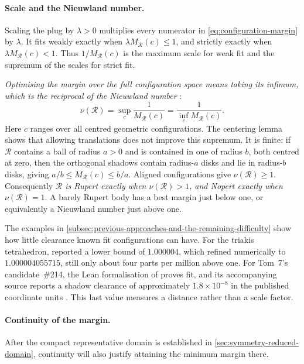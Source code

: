 \paragraph{Scale and the Nieuwland number.}
Scaling the plug by $\lambda>0$ multiplies every numerator in
\cref{eq:configuration-margin} by $\lambda$. It fits weakly exactly when
$\lambda M_{\mathcal R}(c)\le1$, and strictly exactly when $\lambda M_{\mathcal R}(c)<1$.
Thus $1/M_{\mathcal R}(c)$ is the maximum scale for weak fit and the supremum of the
scales for strict fit.

\emph{Optimising the margin over the full configuration space means taking
its infimum, which is the reciprocal of the Nieuwland number}
\citep[Definition~3]{SteiningerYurkevich2023}:
\begin{equation}\label{eq:nieuwland-number-and-margin}
  \nu(\mathcal R)=\sup_c\frac{1}{M_{\mathcal R}(c)}
        =\frac{1}{\inf_c M_{\mathcal R}(c)}.
\end{equation}
Here $c$ ranges over all centred geometric configurations. The centering
lemma shows that allowing translations does not improve this supremum.
It is finite: if $\mathcal R$ contains a ball of radius $a>0$ and is contained in
one of radius $b$, both centred at zero, then the orthogonal shadows contain
radius-$a$ disks and lie in radius-$b$ disks, giving
$a/b\le M_{\mathcal R}(c)\le b/a$. Aligned configurations give $\nu(\mathcal R)\ge1$.
Consequently \emph{$\mathcal R$ is Rupert exactly when $\nu(\mathcal R)>1$, and Nopert exactly
when $\nu(\mathcal R)=1$}. A barely Rupert body has a best margin just below one,
or equivalently a Nieuwland number just above one.

The examples in \cref{subsec:previous-approaches-and-the-remaining-difficulty}
show how little clearance known fit configurations can have. For the triakis
tetrahedron, \citet{Fredriksson2024} reported a lower bound of $1.000004$,
which \citet{GosainGrimmer2025V1} refined numerically to $1.000004055715$,
still only about four parts per million above one.
For Tom~7's candidate~\#214, the Lean formalisation of
\citet{RenshawRupertLean} proves fit,
and its accompanying source reports a shadow clearance of approximately
$1.8\times10^{-8}$ in the published coordinate units
\citep{Renshaw2026Nopert214Video,RenshawRupertLean}.
This last value measures a distance rather than a scale factor.

\paragraph{Continuity of the margin.}
After the compact
representative domain is established in \cref{sec:symmetry-reduced-domain},
continuity will also justify attaining the minimum margin there.


